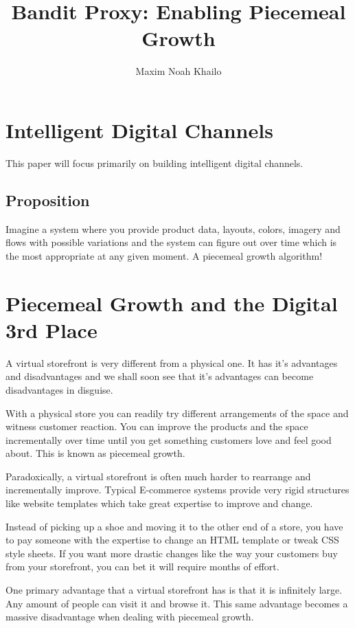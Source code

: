 \documentclass[11pt]{article}
\title{Bandit Proxy: Enabling Piecemeal Growth}
\author{Maxim Noah Khailo}
\begin{document}
\maketitle
\section{Intelligent Digital Channels}

This paper will focus primarily on building intelligent digital channels.

\subsection{Proposition}

Imagine a system where you provide product data, layouts, colors, imagery and flows 
with possible variations and the system can figure out over time which is the most appropriate
at any given moment. A piecemeal growth algorithm!

\section{Piecemeal Growth and the Digital 3rd Place}

A virtual storefront is very different from a physical one. It has it's 
advantages and disadvantages and we shall soon see that it's advantages can 
become disadvantages in disguise. 

With a physical store you can readily try different arrangements of the space and
witness customer reaction. You can improve the products and the space
incrementally over time until you get something customers love and feel good about.
This is known as piecemeal growth.

Paradoxically, a virtual storefront is often much harder to rearrange and incrementally
improve. Typical E-commerce systems provide very rigid structures like website
templates which take great expertise to improve and change. 

Instead of picking up a shoe and moving it to the other end of a store, you have 
to pay someone with the expertise to change an HTML template or tweak CSS style sheets.
If you want more drastic changes like the way your customers buy from your storefront,
you can bet it will require months of effort.

One primary advantage that a virtual storefront has is that it is infinitely large. Any
amount of people can visit it and browse it. This same advantage becomes a massive
disadvantage when dealing with piecemeal growth.
\end{document}
